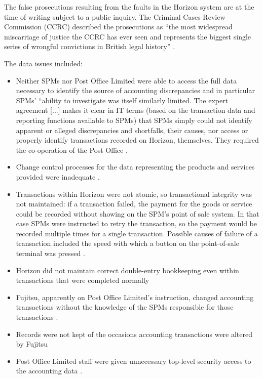 The false prosecutions resulting from the faults in the Horizon system are at the time of writing subject to a public inquiry. The Criminal Cases Review Commission (CCRC) described the prosecutions as ``the most widespread miscarriage of justice the CCRC has ever seen and represents the biggest single series of wrongful convictions in British legal history''  \cite{citation:horizon_ccrc}.

The data issues included:
\begin{itemize}
	\item Neither SPMs nor Post Office Limited were able to access the full data necessary to identify the source of accounting discrepancies \cite[]{citation:bates_v_pol} and in particular SPMs' ``ability to
	investigate was itself similarly limited. The expert agreement [...]
	makes it clear in IT terms (based on the transaction data and reporting functions
	available to SPMs) that SPMs simply could not identify apparent or alleged
	discrepancies and shortfalls, their causes, nor access or properly identify transactions
	recorded on Horizon, themselves. They required the co-operation of the Post Office \cite[]{citation:bates_v_pol}.
	\item Change control processes for the data representing the products and services provided were inadequate \cite[]{citation:bates_v_pol_tech}.
	\item Transactions within Horizon were not atomic, so transactional integrity was not maintained: if a transaction failed, the payment for the goods or service could be recorded without showing on the SPM's point of sale system. In that case SPMs were instructed to retry the transaction, so the payment would be recorded multiple times for a single transaction. Possible causes of failure of a transaction included the speed with which a button on the point-of-sale terminal was pressed \cite[]{citation:bates_v_pol}.
	\item Horizon did not maintain correct double-entry bookkeeping even within transactions that were completed normally \cite[\textsection 128ff]{citation:bates_v_pol_tech}
	\item Fujitsu, apparently on Post Office Limited's instruction, changed accounting transactions without the knowledge of the SPMs responsible for those transactions \cite[]{citation:bates_v_pol_tech}.
	\item Records were not kept of the occasions accounting transactions were altered by Fujitsu \cite[, ]{citation:bates_v_pol}
	\item Post Office Limited staff were given unnecessary top-level security access to the accounting data \cite[]{citation:bates_v_pol}.
\end{itemize}

